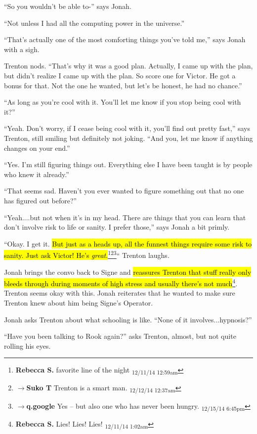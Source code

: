 ``So you wouldn't be able to-'' says Jonah.

``Not unless I had all the computing power in the universe.''

``That's actually one of the most comforting things you've told me,'' says Jonah with a sigh.

Trenton nods.  ``That's why it was a good plan.  Actually, I came up with the plan, but didn't realize I came up with the plan.  So score one for Victor.  He got a bonus for that.  Not the one he wanted, but let's be honest, he had no chance.''

``As long as you're cool with it.  You'll let me know if you stop being cool with it?''

``Yeah.  Don't worry, if I cease being cool with it, you'll find out pretty fast,'' says Trenton, still smiling but definitely not joking.  ``And you, let me know if anything changes on your end.''

``Yes.  I'm still figuring things out. Everything else I have been taught is by people who knew it already.''

``That seems sad.  Haven't you ever wanted to figure something out that no one has figured out before?''

``Yeah....but not when it's in my head. There are things that you can learn that don't involve risk to life or sanity.  I prefer those,'' says Jonah a bit primly.

``Okay.  I get it.  \hl{But just as a heads up, all the funnest things require some risk to sanity. Just ask Victor!   He's \textit{great}.}\footnote{\textbf{Rebecca S. }favorite line of the night \textsubscript{12/11/14 12:59am}}\footnote{$\rightarrow$\textbf{Suko T }Trenton is a smart man. \textsubscript{12/12/14 12:37am}}\footnote{$\rightarrow$\textbf{q.google }Yes -- but also one who has never been hungry. \textsubscript{12/15/14 6:45pm}}`` Trenton laughs.

Jonah brings the convo back to Signe and \hl{reassures Trenton that stuff really only bleeds through during moments of high stress and usually there's not much}\footnote{\textbf{Rebecca S. }Lies! Lies! Lies! \textsubscript{12/11/14 1:02am}}.  Trenton seems okay with this.  Jonah reiterates that he wanted to make sure Trenton knew about him being Signe's Operator.



Jonah asks Trenton about what schooling is like.  ``None of it involves...hypnosis?''

``Have you been talking to Rook again?'' asks Trenton, almost, but not quite rolling his eyes.

